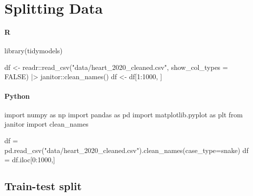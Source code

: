 \documentclass[
  letterpaper,
  DIV=11,
  numbers=noendperiod]{scrreprt}
\newenvironment{Shaded}{\begin{snugshade}}{\end{snugshade}}
\newcommand{\AttributeTok}[1]{\textcolor[rgb]{0.40,0.46,0.14}{#1}}
\newcommand{\ConstantTok}[1]{\textcolor[rgb]{0.56,0.35,0.01}{#1}}
\newcommand{\DecValTok}[1]{\textcolor[rgb]{0.68,0.00,0.00}{#1}}
\newcommand{\FunctionTok}[1]{\textcolor[rgb]{0.28,0.35,0.67}{#1}}
\newcommand{\ImportTok}[1]{\textcolor[rgb]{0.00,0.46,0.62}{#1}}
\newcommand{\NormalTok}[1]{\textcolor[rgb]{0.00,0.46,0.62}{#1}}
\newcommand{\OperatorTok}[1]{\textcolor[rgb]{0.37,0.37,0.37}{#1}}
\newcommand{\OtherTok}[1]{\textcolor[rgb]{0.00,0.46,0.62}{#1}}
\newcommand{\SpecialCharTok}[1]{\textcolor[rgb]{0.37,0.37,0.37}{#1}}
\newcommand{\StringTok}[1]{\textcolor[rgb]{0.13,0.47,0.30}{#1}}
\begin{document}
\hypertarget{splitting-data}{%
\chapter{Splitting Data}\label{splitting-data}}

\hypertarget{r-51}{%
\subsubsection{R}\label{r-51}}

\begin{Shaded}
\begin{Highlighting}[]
\FunctionTok{library}\NormalTok{(tidymodels)}

\NormalTok{df }\OtherTok{\textless{}{-}}\NormalTok{ readr}\SpecialCharTok{::}\FunctionTok{read\_csv}\NormalTok{(}\StringTok{"data/heart\_2020\_cleaned.csv"}\NormalTok{, }\AttributeTok{show\_col\_types =} \ConstantTok{FALSE}\NormalTok{) }\SpecialCharTok{|\textgreater{}} 
\NormalTok{    janitor}\SpecialCharTok{::}\FunctionTok{clean\_names}\NormalTok{()}
\NormalTok{df }\OtherTok{\textless{}{-}}\NormalTok{ df[}\DecValTok{1}\SpecialCharTok{:}\DecValTok{1000}\NormalTok{, ]}
\end{Highlighting}
\end{Shaded}

\hypertarget{python-51}{%
\subsubsection{Python}\label{python-51}}

\begin{Shaded}
\begin{Highlighting}[]
\ImportTok{import}\NormalTok{ numpy }\ImportTok{as}\NormalTok{ np}
\ImportTok{import}\NormalTok{ pandas }\ImportTok{as}\NormalTok{ pd}
\ImportTok{import}\NormalTok{ matplotlib.pyplot }\ImportTok{as}\NormalTok{ plt}
\ImportTok{from}\NormalTok{ janitor }\ImportTok{import}\NormalTok{ clean\_names}

\NormalTok{df }\OperatorTok{=}\NormalTok{ pd.read\_csv(}\StringTok{"data/heart\_2020\_cleaned.csv"}\NormalTok{).clean\_names(case\_type}\OperatorTok{=}\StringTok{\textquotesingle{}snake\textquotesingle{}}\NormalTok{)}
\NormalTok{df }\OperatorTok{=}\NormalTok{ df.iloc[}\DecValTok{0}\NormalTok{:}\DecValTok{1000}\NormalTok{,]}
\end{Highlighting}
\end{Shaded}

\hypertarget{train-test-split}{%
\section{Train-test split}\label{train-test-split}}
\end{document}
